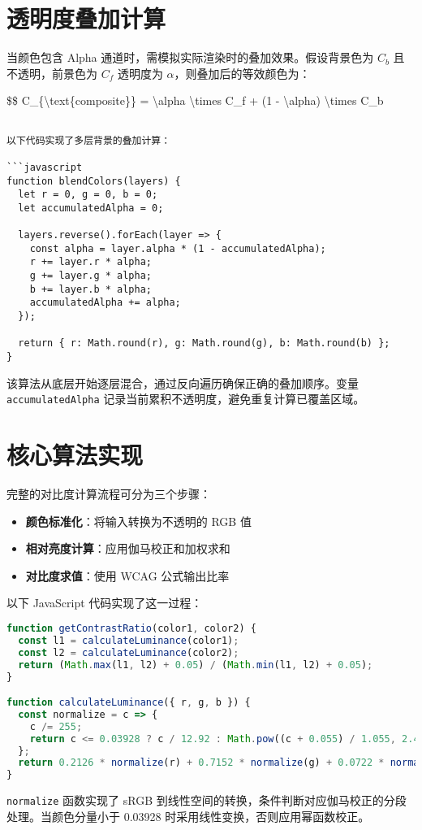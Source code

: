 \chapter{透明度叠加计算}
当颜色包含 Alpha 通道时，需模拟实际渲染时的叠加效果。假设背景色为 $C_b$ 且不透明，前景色为 $C_f$ 透明度为 $\alpha$，则叠加后的等效颜色为：\par
\${}\${}
C\_{}\{{}\textbackslash{}text\{{}composite\}{}\}{} = \textbackslash{}alpha \textbackslash{}times C\_{}f + (1 - \textbackslash{}alpha) \textbackslash{}times C\_{}b\par
\begin{lstlisting}

以下代码实现了多层背景的叠加计算：

```javascript
function blendColors(layers) {
  let r = 0, g = 0, b = 0;
  let accumulatedAlpha = 0;
  
  layers.reverse().forEach(layer => {
    const alpha = layer.alpha * (1 - accumulatedAlpha);
    r += layer.r * alpha;
    g += layer.g * alpha;
    b += layer.b * alpha;
    accumulatedAlpha += alpha;
  });
  
  return { r: Math.round(r), g: Math.round(g), b: Math.round(b) };
}
\end{lstlisting}
该算法从底层开始逐层混合，通过反向遍历确保正确的叠加顺序。变量 \verb!accumulatedAlpha! 记录当前累积不透明度，避免重复计算已覆盖区域。\par
\chapter{核心算法实现}
完整的对比度计算流程可分为三个步骤：\par
\begin{itemize}
\item \textbf{颜色标准化}：将输入转换为不透明的 RGB 值
\item \textbf{相对亮度计算}：应用伽马校正和加权求和
\item \textbf{对比度求值}：使用 WCAG 公式输出比率
\end{itemize}
以下 JavaScript 代码实现了这一过程：\par
\begin{lstlisting}[language=javascript]
function getContrastRatio(color1, color2) {
  const l1 = calculateLuminance(color1);
  const l2 = calculateLuminance(color2);
  return (Math.max(l1, l2) + 0.05) / (Math.min(l1, l2) + 0.05);
}

function calculateLuminance({ r, g, b }) {
  const normalize = c => {
    c /= 255;
    return c <= 0.03928 ? c / 12.92 : Math.pow((c + 0.055) / 1.055, 2.4);
  };
  return 0.2126 * normalize(r) + 0.7152 * normalize(g) + 0.0722 * normalize(b);
}
\end{lstlisting}
\verb!normalize! 函数实现了 sRGB 到线性空间的转换，条件判断对应伽马校正的分段处理。当颜色分量小于 0.03928 时采用线性变换，否则应用幂函数校正。\par
